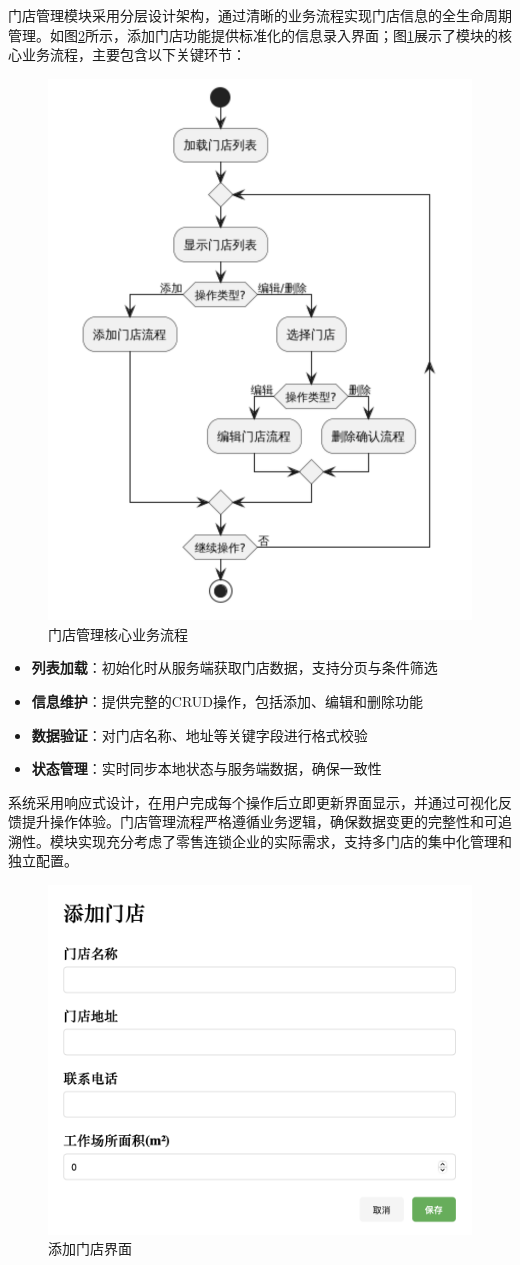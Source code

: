 \documentclass{ctexart}
\begin{document}
门店管理模块采用分层设计架构，通过清晰的业务流程实现门店信息的全生命周期管理。如图\ref{fig:store-add}所示，添加门店功能提供标准化的信息录入界面；图\ref{fig:store-flow}展示了模块的核心业务流程，主要包含以下关键环节：
\begin{figure}[H]
    \centering
    \includegraphics[width=0.5\linewidth]{./source/门店管理流程.png}
    \caption{门店管理核心业务流程}
    \label{fig:store-flow}
\end{figure}

\begin{itemize}
    \item \textbf{列表加载}：初始化时从服务端获取门店数据，支持分页与条件筛选
    \item \textbf{信息维护}：提供完整的CRUD操作，包括添加、编辑和删除功能
    \item \textbf{数据验证}：对门店名称、地址等关键字段进行格式校验
    \item \textbf{状态管理}：实时同步本地状态与服务端数据，确保一致性
\end{itemize}

系统采用响应式设计，在用户完成每个操作后立即更新界面显示，并通过可视化反馈提升操作体验。门店管理流程严格遵循业务逻辑，确保数据变更的完整性和可追溯性。模块实现充分考虑了零售连锁企业的实际需求，支持多门店的集中化管理和独立配置。

\begin{figure}[H]
    \centering
    \includegraphics[width=0.3\linewidth]{./source/添加门店.png}
    \caption{添加门店界面}
    \label{fig:store-add}
\end{figure}
\end{document}
